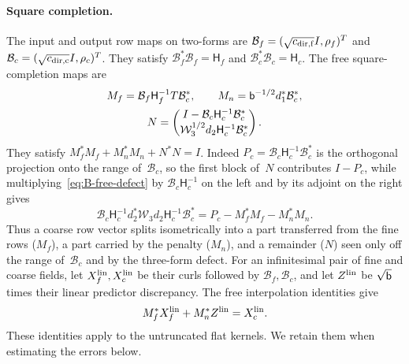 \paragraph{Square completion.} The input and output row maps on two-forms are $\mathcal B_f=(\sqrt{c_{{\rm dir},{\rm f}}}I,\rho_f)^T$ and $\mathcal B_c=(\sqrt{c_{{\rm dir},{\rm c}}}I,\rho_c)^T$. They satisfy $\mathcal B_f^*\mathcal B_f=\mathsf H_f$ and $\mathcal B_c^*\mathcal B_c=\mathsf H_c$. The free square-completion maps are
\begin{gather*}
M_f=\mathcal B_f\mathsf H_f^{-1}T\mathcal B_c^*,\qquad
M_n=\mathsf{b}^{-1/2}d_1^*\mathcal B_c^*,\\
N=\begin{pmatrix}I-\mathcal B_c\mathsf H_c^{-1}\mathcal B_c^*\\
\mathcal W_3^{1/2}d_2\mathsf H_c^{-1}\mathcal B_c^*\end{pmatrix}.
\end{gather*}
They satisfy $M_f^*M_f+M_n^*M_n+N^*N=I$. Indeed $P_c=\mathcal B_c\mathsf H_c^{-1}\mathcal B_c^*$ is the orthogonal projection onto the range of~$\mathcal B_c$, so the first block of~$N$ contributes $I-P_c$, while multiplying~\eqref{eq:B-free-defect} by $\mathcal B_c\mathsf H_c^{-1}$ on the left and by its adjoint on the right gives
\begin{equation*}
\mathcal B_c\mathsf H_c^{-1}d_2^*\mathcal W_3d_2\mathsf H_c^{-1}\mathcal B_c^*=P_c-M_f^*M_f-M_n^*M_n.
\end{equation*}
Thus a coarse row vector splits isometrically into a part transferred from the fine rows ($M_f$), a part carried by the penalty ($M_n$), and a remainder ($N$) seen only off the range of~$\mathcal B_c$ and by the three-form defect. For an infinitesimal pair of fine and coarse fields, let $X_f^{\rm lin},X_c^{\rm lin}$ be their curls followed by $\mathcal B_f,\mathcal B_c$, and let $Z^{\rm lin}$ be $\sqrt{\mathsf{b}}$ times their linear predictor discrepancy. The free interpolation identities give
\begin{equation}\label{eq:B-flat-rows}
M_f^*X_f^{\rm lin}+M_n^*Z^{\rm lin}=X_c^{\rm lin}.
\end{equation}
These identities apply to the untruncated flat kernels. We retain them when estimating the errors below.

